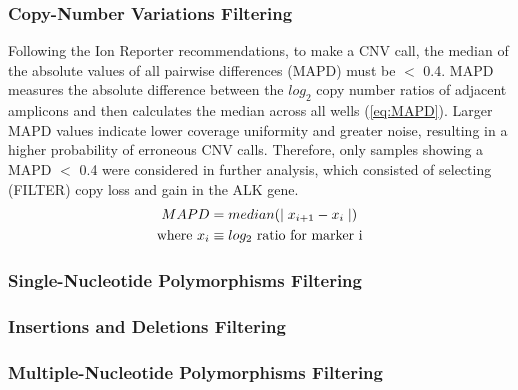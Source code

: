 \subsubsection{Copy-Number Variations Filtering}

Following the Ion Reporter\texttrademark{} recommendations, to make a CNV call, the median of the absolute values of all pairwise differences (MAPD) must be $<$ 0.4. MAPD measures the absolute difference between the $log_2$ copy number ratios of adjacent amplicons and then calculates the median across all wells (\autoref{eq:MAPD}). Larger MAPD values indicate lower coverage uniformity and greater noise, resulting in a higher probability of erroneous CNV calls. Therefore, only samples showing a MAPD $<$ 0.4 were considered in further analysis, which consisted of selecting (FILTER) copy loss and gain in the ALK gene.
\begin{align} \label{eq:MAPD}
    MAPD &= median(\mid x_{i+1}-x_i \mid) \\
    \text{where}~  
    x_i &\equiv \text{$log_2$ ratio for marker i} \notag
\end{align}

\subsubsection{Single-Nucleotide Polymorphisms Filtering}


\subsubsection{Insertions and Deletions Filtering}


\subsubsection{Multiple-Nucleotide Polymorphisms Filtering}



